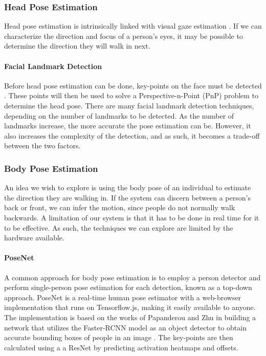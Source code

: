 \subsubsection{Head Pose Estimation} \label{sec:backHeadPoseEstimation}
Head pose estimation is intrinsically linked with visual gaze estimation \cite{Murphy-Chutorian2009}. If we can characterize the direction and focus of a person's eyes, it may be possible to determine the direction they will walk in next.

\paragraph{Facial Landmark Detection}
Before head pose estimation can be done, key-points on the face must be detected \cite{Kazemi2014}. These points will then be used to solve a Perspective-n-Point (PnP) problem to determine the head pose. There are many facial landmark detection techniques, depending on the number of landmarks to be detected. As the number of landmarks increase, the more accurate the pose estimation can be. However, it also increases the complexity of the detection, and as such, it becomes a trade-off between the two factors.

\subsubsection{Body Pose Estimation} \label{sec:backBodyPoseEstimation}
An idea we wish to explore is using the body pose of an individual to estimate the direction they are walking in. If the system can discern between a person's back or front, we can infer the motion, since people do not normally walk backwards. A limitation of our system is that it has to be done in real time for it to be effective. As such, the techniques we can explore are limited by the hardware available.

\paragraph{PoseNet} A common approach for body pose estimation is to employ a person detector and perform single-person pose estimation for each detection, known as a top-down approach. PoseNet is a real-time human pose estimator with a web-browser implementation that runs on Tensorflow.js, making it easily available to anyone. The implementation is based on the works of Papanderou and Zhu \cite{Papandreou2017} in building a network that utilizes the Faster-RCNN model as an object detector to obtain accurate bounding boxes of people in an image \cite{Ren2017}. The key-points are then calculated using a a ResNet \cite{He2016} by predicting activation heatmaps and offsets.

